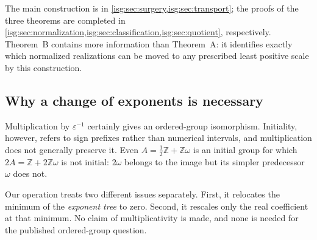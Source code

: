 \documentclass[11pt]{article}
\theoremstyle{definition}
\theoremstyle{remark}
\newcommand{\Z}{\mathbb{Z}}
\begin{document}
The main construction is in \cref{isg:sec:surgery,isg:sec:transport}; the proofs
of the three theorems are completed in
\cref{isg:sec:normalization,isg:sec:classification,isg:sec:quotient}, respectively.
Theorem~B contains more information than Theorem~A: it identifies exactly
which normalized realizations can be moved to any prescribed least
positive scale by this construction.

\subsection{Why a change of exponents is necessary}
Multiplication by $\varepsilon^{-1}$ certainly gives an ordered-group
isomorphism. Initiality, however, refers to sign prefixes rather than
numerical intervals, and multiplication does not generally preserve it.
Even $A=\frac12\Z+\Z\omega$ is an initial group for which
$2A=\Z+2\Z\omega$ is not initial: $2\omega$ belongs to the image but
its simpler predecessor $\omega$ does not.

Our operation treats two different issues separately. First, it relocates
the minimum of the \emph{exponent tree} to zero. Second, it rescales only
the real coefficient at that minimum. No claim of multiplicativity is
made, and none is needed for the published ordered-group question.
\end{document}
